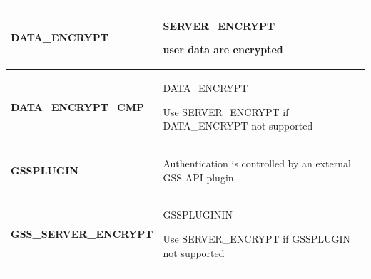 \documentclass{article}
\begin{document}
\begin{itemize}
\begin{center}
\begin{tabularx}{\textwidth}{l X}
\\\hline
\textbf{DATA\_ENCRYPT} &
\begin{compactitem}[\ding{212}]
\item SERVER\_ENCRYPT
\item user data are encrypted
\end{compactitem}
\\\hline
\textbf{DATA\_ENCRYPT\_CMP} &
\begin{compactitem}[\ding{212}]
\item DATA\_ENCRYPT
\item Use SERVER\_ENCRYPT if DATA\_ENCRYPT not supported
\end{compactitem}
\\\hline
\textbf{GSSPLUGIN} &
\begin{compactitem}[\ding{212}]
\item Authentication is controlled by an external GSS-API plugin
\end{compactitem} 
\\\hline
\textbf{GSS\_SERVER\_ENCRYPT} &
\begin{compactitem}[\ding{212}]
\item GSSPLUGININ
\item Use SERVER\_ENCRYPT if GSSPLUGIN not supported
\end{compactitem}
\\
\bottomrule
\end{tabularx}
\end{center}
\end{itemize}

\newpage
\end{document}
